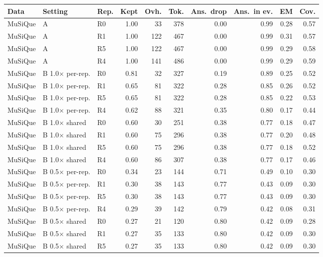 \begin{table}[t]
\centering
\footnotesize
\begin{tabular}{@{}lllrrrrrrr@{}}
\toprule
Data & Setting & Rep. & Kept & Ovh. & Tok. & Ans.\ drop & Ans.\ in ev. & EM & Cov. \\
\midrule
MuSiQue & A & R0 & 1.00 & 33 & 378 & 0.00 & 0.99 & 0.28 & 0.57 \\
MuSiQue & A & R1 & 1.00 & 122 & 467 & 0.00 & 0.99 & 0.31 & 0.57 \\
MuSiQue & A & R5 & 1.00 & 122 & 467 & 0.00 & 0.99 & 0.29 & 0.58 \\
MuSiQue & A & R4 & 1.00 & 141 & 486 & 0.00 & 0.99 & 0.29 & 0.59 \\
MuSiQue & B 1.0$\times$ per-rep. & R0 & 0.81 & 32 & 327 & 0.19 & 0.89 & 0.25 & 0.52 \\
MuSiQue & B 1.0$\times$ per-rep. & R1 & 0.65 & 81 & 322 & 0.28 & 0.85 & 0.26 & 0.52 \\
MuSiQue & B 1.0$\times$ per-rep. & R5 & 0.65 & 81 & 322 & 0.28 & 0.85 & 0.22 & 0.53 \\
MuSiQue & B 1.0$\times$ per-rep. & R4 & 0.62 & 88 & 321 & 0.35 & 0.80 & 0.17 & 0.44 \\
MuSiQue & B 1.0$\times$ shared & R0 & 0.60 & 30 & 251 & 0.38 & 0.77 & 0.18 & 0.47 \\
MuSiQue & B 1.0$\times$ shared & R1 & 0.60 & 75 & 296 & 0.38 & 0.77 & 0.20 & 0.48 \\
MuSiQue & B 1.0$\times$ shared & R5 & 0.60 & 75 & 296 & 0.38 & 0.77 & 0.18 & 0.52 \\
MuSiQue & B 1.0$\times$ shared & R4 & 0.60 & 86 & 307 & 0.38 & 0.77 & 0.17 & 0.46 \\
MuSiQue & B 0.5$\times$ per-rep. & R0 & 0.34 & 23 & 144 & 0.71 & 0.49 & 0.10 & 0.30 \\
MuSiQue & B 0.5$\times$ per-rep. & R1 & 0.30 & 38 & 143 & 0.77 & 0.43 & 0.09 & 0.30 \\
MuSiQue & B 0.5$\times$ per-rep. & R5 & 0.30 & 38 & 143 & 0.77 & 0.43 & 0.09 & 0.30 \\
MuSiQue & B 0.5$\times$ per-rep. & R4 & 0.29 & 39 & 142 & 0.79 & 0.42 & 0.08 & 0.31 \\
MuSiQue & B 0.5$\times$ shared & R0 & 0.27 & 21 & 120 & 0.80 & 0.42 & 0.09 & 0.28 \\
MuSiQue & B 0.5$\times$ shared & R1 & 0.27 & 35 & 133 & 0.80 & 0.42 & 0.09 & 0.30 \\
MuSiQue & B 0.5$\times$ shared & R5 & 0.27 & 35 & 133 & 0.80 & 0.42 & 0.09 & 0.30 \\

\end{tabular}
\end{table}
